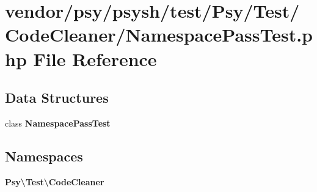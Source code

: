 \section{vendor/psy/psysh/test/\+Psy/\+Test/\+Code\+Cleaner/\+Namespace\+Pass\+Test.php File Reference}
\label{_namespace_pass_test_8php}
\subsection*{Data Structures}
\begin{DoxyCompactItemize}
\item 
class {\bf Namespace\+Pass\+Test}
\end{DoxyCompactItemize}
\subsection*{Namespaces}
\begin{DoxyCompactItemize}
\item 
 {\bf Psy\textbackslash{}\+Test\textbackslash{}\+Code\+Cleaner}
\end{DoxyCompactItemize}
